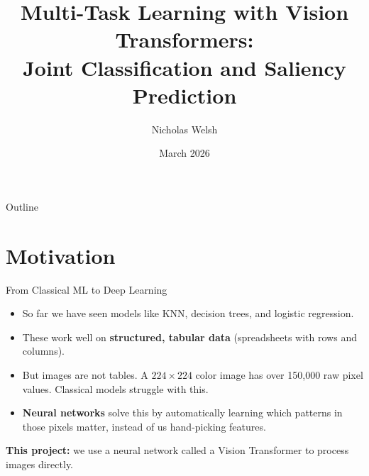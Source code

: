 \documentclass{beamer}
\title[Multi-Task ViT]{Multi-Task Learning with Vision Transformers:\\Joint Classification and Saliency Prediction}
\author{Nicholas Welsh}
\institute{Florida Institute of Technology\\Department of Computer Science \& Mathematics}
\date{March 2026}
\begin{document}
\begin{frame}
  \titlepage
\end{frame}

\begin{frame}{Outline}
  \tableofcontents
\end{frame}

\section{Motivation}

\begin{frame}{From Classical ML to Deep Learning}
\begin{itemize}
  \item So far we have seen models like KNN, decision trees, and logistic regression.
  \item These work well on \textbf{structured, tabular data} (spreadsheets with rows and columns).
  \item But images are not tables. A $224\!\times\!224$ color image has over 150,000 raw pixel values. Classical models struggle with this.
  \item \textbf{Neural networks} solve this by automatically learning which patterns in those pixels matter, instead of us hand-picking features.
\end{itemize}
\vfill
\textbf{This project:} we use a neural network called a Vision Transformer to process images directly.
\end{frame}
\end{document}
